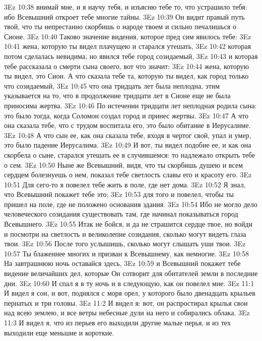 \vs 3Ez 10:38 внимай мне, и я научу тебя, и изъясню тебе то, что устрашило тебя: ибо Всевышний откроет тебе многие тайны.
\vs 3Ez 10:39 Он видит правый путь твой, что ты непрестанно скорбишь о народе твоем и сильно печалишься о Сионе.
\vs 3Ez 10:40 Таково значение видения, которое пред сим явилось тебе:
\vs 3Ez 10:41 жена, которую ты видел плачущею и старался утешать,
\vs 3Ez 10:42 которая потом сделалась невидима, но явился тебе город созидаемый,
\vs 3Ez 10:43 и которая тебе рассказала о смерти сына своего, вот что значит:
\vs 3Ez 10:44 жена, которую ты видел, это Сион. А что сказала тебе та, которую ты видел, как город только что созидаемый,
\vs 3Ez 10:45 что она тридцать лет была неплодна, этим указывается на то, что в продолжение тридцати лет в Сионе еще не была приносима жертва.
\vs 3Ez 10:46 По истечении тридцати лет неплодная родила сына: это было тогда, когда Соломон создал город и принес жертвы.
\vs 3Ez 10:47 А что она сказала тебе, что с трудом воспитала его, это было обитание в Иерусалиме.
\vs 3Ez 10:48 А что сын ее, как она сказала тебе, входя в чертог свой, упал и умер, это было падение Иерусалима.
\vs 3Ez 10:49 И вот, ты видел подобие ее, и как она скорбела о сыне, старался утешать ее в случившемся: то надлежало открыть тебе о сем.
\vs 3Ez 10:50 Ныне же Всевышний, видя, что ты скорбишь душею и всем сердцем болезнуешь о нем, показал тебе светлость славы его и красоту его.
\vs 3Ez 10:51 Для сего-то я повелел тебе жить в поле, где нет дома.
\vs 3Ez 10:52 Я знал, что Всевышний покажет тебе это;
\vs 3Ez 10:53 для того и повелел, чтобы ты пришел на поле, где не положено основания здания.
\vs 3Ez 10:54 Ибо не могло дело человеческого созидания существовать там, где начинал показываться город Всевышнего.
\vs 3Ez 10:55 Итак не бойся, и да не страшится сердце твое, но войди и посмотри на светлость и великолепие созидания, сколько могут видеть глаза твои.
\vs 3Ez 10:56 После того услышишь, сколько могут слышать уши твои.
\vs 3Ez 10:57 Ты блаженнее многих и призван к Всевышнему, как немногие.
\vs 3Ez 10:58 На завтрашнюю ночь оставайся здесь,
\vs 3Ez 10:59 и Всевышний покажет тебе видение величайших дел, которые Он сотворит для обитателей земли в последние дни.
\vs 3Ez 10:60 И спал я в ту ночь и в следующую, как он повелел мне.
\vs 3Ez 11:1 И видел я сон, и вот, поднялся с моря орел, у которого было двенадцать крыльев пернатых и три головы.
\vs 3Ez 11:2 И видел я: вот, он распростирал крылья свои над всею землею, и все ветры небесные дули на него и собирались облака.
\vs 3Ez 11:3 И видел я, что из перьев его выходили другие малые перья, и из тех выходили еще меньшие и короткие.
